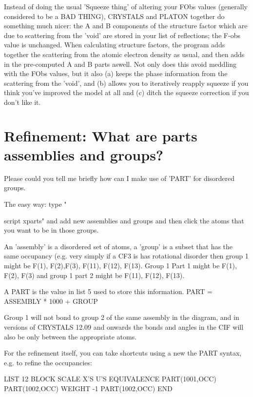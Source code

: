 \documentclass[10pt,a4paper]{report}
\begin{document}
Instead of doing the usual 'Squeeze thing' of altering your FObs values
(generally considered to be a BAD THING), CRYSTALS and PLATON together
do something much nicer: the A and B components of the structure factor
which are due to scattering from the 'void' are stored in your list of 
reflections; the F-obs value is unchanged. When calculating structure
factors, the program adds together the scattering from the atomic
electron density as usual, and then adds in the pre-computed A and B 
parts aswell. Not only does this avoid meddling with the FObs values,
but it also (a) keeps the phase information from the scattering from
the 'void', and (b) allows you to iteratively reapply squeeze if you
think you've improved the model at all and (c) ditch the squeeze
correction if you don't like it.




\section{Refinement: What are parts assemblies and groups?}

Please could you tell me briefly how can I make use of 'PART' for 
disordered groups.



The easy way: type "

script xparts" and add new assemblies and groups
and then click the atoms that you want to be in those groups.



An 'assembly' is a disordered set of atoms, a 'group' is a subset
that has the same occupancy (e.g. very simply if a CF3 is has
rotational disorder then group 1 might be F(1), F(2),F(3),
F(11), F(12), F(13). Group 1 Part 1 might be F(1), F(2), F(3) and
group 1 part 2 might be F(11), F(12), F(13).



A PART is the value in list 5 used to store this information.
PART = ASSEMBLY * 1000 + GROUP



Group 1 will not bond to group 2 of the same assembly in the diagram,
and in versions of CRYSTALS 12.09 and onwards the bonds and angles
in the CIF will also be only between the appropriate atoms.



For the refinement itself, you can take shortcuts using a new
the PART syntax, e.g. to refine the occupancies:


LIST 12
BLOCK SCALE X'S U'S
EQUIVALENCE PART(1001,OCC) PART(1002,OCC)
WEIGHT -1 PART(1002,OCC)
END
\end{document}
